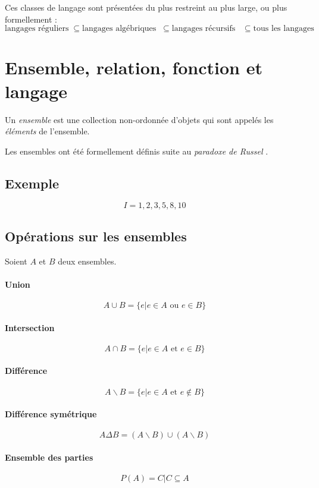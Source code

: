 \documentclass[12pt, a4paper]{report}
\begin{document}
Ces classes de langage sont présentées du plus restreint au plus large, ou
plus formellement :
\[
\text{langages réguliers}
\;\subseteq\text{langages algébriques}
\;\;\subseteq\text{langages récursifs}
\;\;\;\subseteq\text{tous les langages}
\]

\section{Ensemble, relation, fonction et langage}


Un \textit{ensemble} est une collection non-ordonnée d'objets qui sont
appelés les \textit{éléments} de l'ensemble.

Les ensembles ont été formellement définis suite au \textit{paradoxe
  de Russel} .

\subsection{Exemple}

\[
I = {1, 2, 3, 5, 8, 10}
\]


\subsection{Opérations sur les ensembles}

Soient $A$ et $B$ deux ensembles.

\paragraph{Union}
\[ A \cup B = \{ e | e \in A \textrm{ ou } e \in B \} \]

\paragraph{Intersection}
\[ A \cap B = \{ e | e \in A \textrm{ et } e \in B \} \]

\paragraph{Différence}
\[ A \backslash B = \{ e | e \in A \textrm{ et } e \not\in B \} \]

\paragraph{Différence symétrique}
\[ A \Delta B = (A \backslash B)\cup (A \backslash B) \]

\paragraph{Ensemble des parties}
\[ P(A) = { C | C \subseteq A} \]
\end{document}
